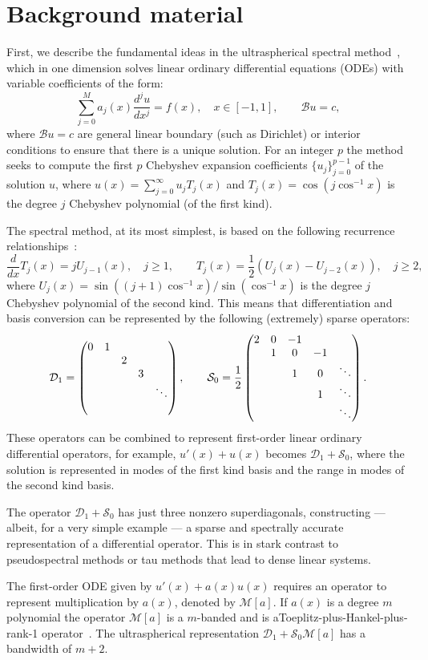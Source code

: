 \documentclass[11pt,a4paper,review]{siamart171218}
\begin{document}
\section{Background material}\label{sec:background}
First, we describe the fundamental ideas in the ultraspherical spectral method~\cite{Olver_13_01}, which in one dimension solves linear ordinary differential equations (ODEs) with variable coefficients of the form: 
\[
\sum_{j=0}^M a_j(x)\frac{d^ju}{dx^j} = f(x), \quad x\in[-1,1], \qquad \mathcal{B}u = c, 
\]
where $\mathcal{B}u=c$ are general linear boundary (such as Dirichlet) or interior conditions to ensure that there is a unique solution. For an integer $p$ the method seeks to compute the first $p$ Chebyshev expansion coefficients $\{u_j\}_{j=0}^{p-1}$ of the solution $u$, where $u(x) = \sum_{j=0}^\infty u_j T_j(x)$ and $T_j(x) = \cos(j\cos^{-1}x)$ is the degree $j$ Chebyshev polynomial (of the first kind). 

The spectral method, at its most simplest, is based on the following recurrence relationships~\cite[(18.9.21) \& (18.9.9)]{NISTHandbook}: 
\[
 \frac{d}{dx} T_j(x) = jU_{j-1}(x), \quad j\geq 1, \qquad T_j(x) = \frac{1}{2}\left(U_{j}(x)-U_{j-2}(x)\right), \quad j\geq 2,
\]
where $U_{j}(x) = \sin((j+1)\cos^{-1}x)/\sin(\cos^{-1}x)$ is the degree $j$ Chebyshev polynomial of the second kind. This means that differentiation and basis conversion can be represented by the following (extremely) sparse operators:
\[
 \mathcal{D}_1 = \begin{pmatrix}0 & 1 \cr &&2\cr &&&3\cr &&&&\ddots\cr & \end{pmatrix}, \qquad \mathcal{S}_0 = \frac{1}{2}\begin{pmatrix}2 & 0 &-1\cr & 1 & 0 & -1 \cr && 1 & 0 & \ddots\cr &&& 1 &\ddots\cr &&&&\ddots  \end{pmatrix}.  
\]
These operators can be combined to represent first-order linear ordinary differential operators, for example, $u'(x) + u(x)$ becomes $\mathcal{D}_1 + \mathcal{S}_0$, where the solution is represented in modes of the first kind basis and the range in modes of the second kind basis. 

The operator $\mathcal{D}_1 + \mathcal{S}_0$ has just three nonzero superdiagonals, constructing --- albeit, for a very simple example --- a sparse and spectrally accurate representation of a differential operator.  This is in stark contrast to pseudospectral methods or tau methods that lead to dense linear systems.  

The first-order ODE given by $u'(x)+a(x)u(x)$ requires an operator to represent multiplication by $a(x)$, denoted by $\mathcal{M}[a]$. If $a(x)$ is a degree $m$ polynomial the operator $\mathcal{M}[a]$ is a $m$-banded and is aToeplitz-plus-Hankel-plus-rank-1 operator~\cite{Olver_13_01}. The ultraspherical representation $\mathcal{D}_1 + \mathcal{S}_0\mathcal{M}[a]$ has a bandwidth of $m+2$. 
\end{document}

